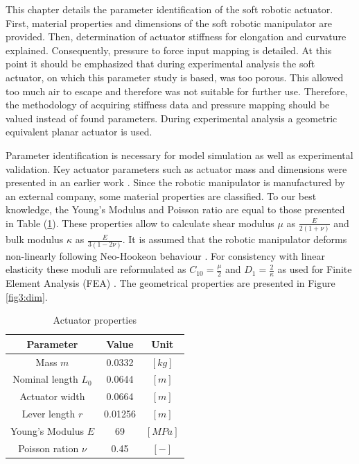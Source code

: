 \label{chap3}

This chapter details the parameter identification of the soft robotic actuator. First, material properties and dimensions of the soft robotic manipulator are provided. Then, determination of actuator stiffness for elongation and curvature explained. Consequently, pressure to force input mapping is detailed. At this point it should be emphasized that during experimental analysis the soft actuator, on which this parameter study is based, was too porous. This allowed too much air to escape and therefore was not suitable for further use. Therefore, the methodology of acquiring stiffness data and pressure mapping should be valued instead of found parameters. During experimental analysis a geometric equivalent planar actuator is used. 


Parameter identification is necessary for model simulation as well as experimental validation. Key actuator parameters such as actuator mass and dimensions were presented in an earlier work \cite{berkers}. Since the robotic manipulator is manufactured by an external company, some material properties are classified. To our best knowledge, the Young's Modulus and Poisson ratio are equal to those presented in Table (\ref{tab4:parameters}). These properties allow to calculate shear modulus $\mu$ as $\frac{E}{2(1+\nu)}$ and bulk modulus $\kappa$ as $\frac{E}{3(1-2\nu)}$. It is assumed that the robotic manipulator deforms non-linearly following Neo-Hookeon behaviour \cite{Caasenbrood2020StiffnessModel}. For consistency with linear elasticity these moduli are reformulated as $C_{10} = \frac{\mu}{2}$ and $D_{1} = \frac{2}{\kappa}$ as used for Finite Element Analysis (FEA) \cite{neohookean}. The geometrical properties are presented in Figure \ref{fig3:dim}.


\begin{table}[H]
    \centering
    \caption{Actuator properties}
    \begin{tabular}{|c|c|c|} \hline
      \textbf{Parameter}   &  \textbf{Value} & \textbf{Unit} \\ \hline
      Mass $m$             &    0.0332       & $[kg]$ \\ 
      Nominal length $L_0$ &    0.0644       & $[m]$  \\ 
      Actuator width       &    0.0664       & $[m]$  \\ 
      Lever length $r$     &    0.01256      & $[m]$  \\ 
      Young's Modulus $E$  &    69           & $[MPa]$\\ 
      Poisson ration $\nu$ &    0.45         & $[-]$ \\ \hline
    \end{tabular}
    \label{tab4:parameters}
\end{table}

